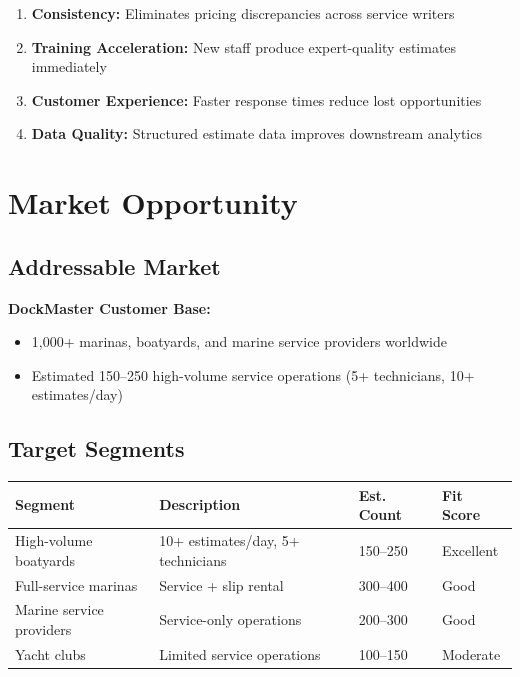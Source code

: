 \documentclass[11pt,a4paper]{article}
\begin{document}
\begin{enumerate}[leftmargin=*]
    \item \textbf{Consistency:} Eliminates pricing discrepancies across service writers
    \item \textbf{Training Acceleration:} New staff produce expert-quality estimates immediately
    \item \textbf{Customer Experience:} Faster response times reduce lost opportunities
    \item \textbf{Data Quality:} Structured estimate data improves downstream analytics
\end{enumerate}

\newpage
\section{Market Opportunity}

\subsection{Addressable Market}

\textbf{DockMaster Customer Base:}
\begin{itemize}[leftmargin=*]
    \item 1,000+ marinas, boatyards, and marine service providers worldwide
    \item Estimated 150--250 high-volume service operations (5+ technicians, 10+ estimates/day)
\end{itemize}

\subsection{Target Segments}

\begin{table}[H]
\centering
\small
\begin{tabularx}{\textwidth}{@{}L{3.5cm}L{5cm}C{2cm}C{2cm}@{}}
\toprule
\textbf{Segment} & \textbf{Description} & \textbf{Est. Count} & \textbf{Fit Score} \\
\midrule
High-volume boatyards & 10+ estimates/day, 5+ technicians & 150--250 & Excellent \\
Full-service marinas & Service + slip rental & 300--400 & Good \\
Marine service providers & Service-only operations & 200--300 & Good \\
Yacht clubs & Limited service operations & 100--150 & Moderate \\
\bottomrule
\end{tabularx}
\end{table}
\end{document}
